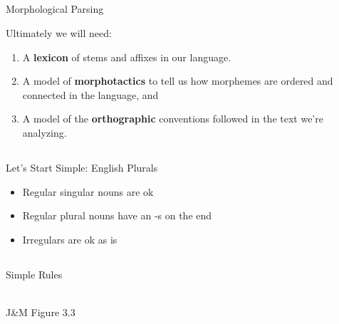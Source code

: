 \documentclass[9pt,xcolor=pdftex,dvipsnames,table]{beamer}
\begin{document}
\subsection{}
\begin{frame}{Morphological Parsing}

{\large Ultimately we will need: }

\begin{enumerate}
	\item A \textbf{lexicon} of stems and affixes in our language.
	\item A model of \textbf{morphotactics} to tell us how morphemes are ordered and connected in the language, and
	\item A model of the \textbf{orthographic} conventions followed in the text we're analyzing.
\end{enumerate}
\end{frame}

\subsection{}
\begin{frame}{Let's Start Simple: English Plurals}

\begin{itemize}
	\item Regular singular nouns are ok
	\item Regular plural nouns have an -s on the end
	\item Irregulars are ok as is
\end{itemize}
\end{frame}

\subsection{}
\begin{frame}{Simple Rules}
\begin{center}
	\\
	{\large J\&M Figure 3.3}\\
	\vspace{.5cm}
	\\
\end{center}
\end{frame}
\end{document}
